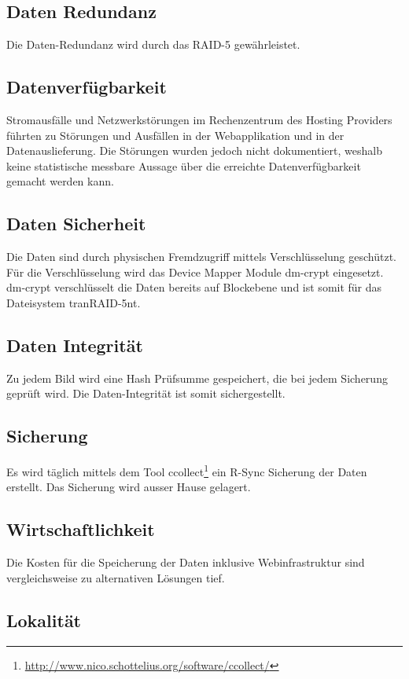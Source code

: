 \subsection{Daten Redundanz}

Die Daten-Redundanz wird durch das RAID-5 gewährleistet.

\subsection{Datenverfügbarkeit}
Stromausfälle und Netzwerkstörungen im Rechenzentrum des Hosting Providers führten zu Störungen und Ausfällen in der Webapplikation und in der Datenauslieferung. Die Störungen wurden jedoch nicht dokumentiert, weshalb keine statistische messbare Aussage über die erreichte Datenverfügbarkeit gemacht werden kann.

\subsection{Daten Sicherheit}
Die Daten sind durch physischen Fremdzugriff mittels Verschlüsselung geschützt. Für die Verschlüsselung wird das Device Mapper Module dm-crypt eingesetzt. dm-crypt verschlüsselt die Daten bereits auf Blockebene und ist somit für das Dateisystem tranRAID-5nt.

\subsection{Daten Integrität}
Zu jedem Bild wird eine Hash Prüfsumme gespeichert, die bei jedem Sicherung geprüft wird. Die Daten-Integrität ist somit sichergestellt.

\subsection{Sicherung}
Es wird täglich mittels dem Tool ccollect\footnote{\url{http://www.nico.schottelius.org/software/ccollect/}} ein R-Sync Sicherung der Daten erstellt. Das Sicherung wird ausser Hause gelagert.

\subsection{Wirtschaftlichkeit}
Die Kosten für die Speicherung der Daten inklusive Webinfrastruktur sind vergleichsweise zu alternativen Lösungen tief.

\subsection{Lokalität}

